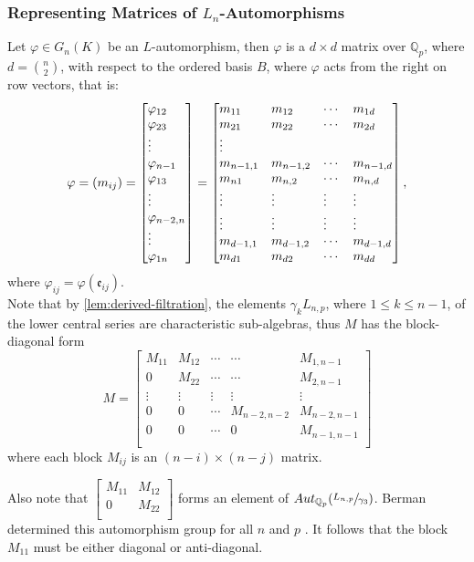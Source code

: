 \documentclass{article}
\newcommand{\e}{\mathfrak{e}}
\begin{document}
\subsubsection{Representing Matrices of $L_n$-Automorphisms}
Let $\varphi\in{G_{n}}(K)$ be an ${L}$-automorphism, then $\varphi$ is a $d\times{d}$ matrix over $\mathbb{Q}_p$, where $d=\binom{n}{2}$, with respect to the ordered basis $B$, where $\varphi$ acts from the right on row vectors, that is:
\[
\varphi=(m_{ij})=\begin{bmatrix*}[l]
\varphi_{12}\\
\varphi_{23}\\
\vdots\\
\varphi_{n-1}\\
\varphi_{13}\\
\vdots\\
\varphi_{n-2,n}\\
\vdots\\
\varphi_{1n}\\
\end{bmatrix*}=\begin{bmatrix*}[l]
m_{11}&m_{12}&\cdots&m_{1d}\\
m_{21}&m_{22}&\cdots&m_{2d}\\
\vdots\\
m_{n-1,1}&m_{n-1,2}&\cdots&m_{n-1,d}\\
m_{n1}&m_{n,2}&\cdots&m_{n,d}\\
\vdots&\vdots&\vdots&\vdots\\
\vdots&\vdots&\vdots&\vdots\\
m_{d-1,1}&m_{d-1,2}&\cdots&m_{d-1,d}\\
m_{d1}&m_{d2}&\cdots&m_{dd}\\
\end{bmatrix*}\\,\]
where $\varphi_{ij}=\varphi(\e_{ij})$.\\
Note that by \ref{lem:derived-filtration}, the elements $\gamma_{k}{L}_{n,p}$, where $1\leq{k}\leq{n}-1$, of the lower central series are characteristic sub-algebras, thus $M$ has the block-diagonal form
\[M=\begin{bmatrix}
M_{11} & M_{12} & \cdots &\cdots & M_{1,n-1}\\
0 & M_{22} & \cdots &\cdots& M_{2,n-1}\\
\vdots & \vdots & \vdots & \vdots&\vdots\\
0 & 0 & \cdots & M_{n-2,n-2}&M_{n-2,n-1}\\
0 & 0 & \cdots&0 & M_{n-1,n-1}\\
\end{bmatrix}
\]
where each block $M_{ij}$ is an $(n-i)\times{(n-j)}$ matrix.\par
Also note that $\begin{bmatrix}
M_{11} & M_{12}\\
0 & M_{22}\\
\end{bmatrix}$ forms an element of $Aut_{\mathbb{Q}_{p}}(\sfrac{{L}_{n,p}}{\gamma_3})$. Berman determined this automorphism group for all $n$ and $p$ \cite[Proposition 3.6]{BermanThesis}. It follows that the block $M_{11}$ must be either diagonal or anti-diagonal.
\end{document}
